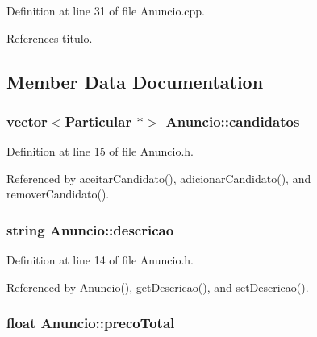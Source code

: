Definition at line 31 of file Anuncio.\+cpp.



References titulo.



\subsection{Member Data Documentation}
\hypertarget{class_anuncio_a387f6bd1b88720d5cf0b53462e5dc0aa}{
\subsubsection[{candidatos}]{\setlength{\rightskip}{0pt plus 5cm}vector$<${\bf Particular} $\ast$$>$ Anuncio\+::candidatos\hspace{0.3cm}{\ttfamily [private]}}}\label{class_anuncio_a387f6bd1b88720d5cf0b53462e5dc0aa}


Definition at line 15 of file Anuncio.\+h.



Referenced by aceitar\+Candidato(), adicionar\+Candidato(), and remover\+Candidato().

\hypertarget{class_anuncio_aa6a9eb8d08cb06d16061b006eb2c8b97}{
\subsubsection[{descricao}]{\setlength{\rightskip}{0pt plus 5cm}string Anuncio\+::descricao\hspace{0.3cm}{\ttfamily [private]}}}\label{class_anuncio_aa6a9eb8d08cb06d16061b006eb2c8b97}


Definition at line 14 of file Anuncio.\+h.



Referenced by Anuncio(), get\+Descricao(), and set\+Descricao().

\hypertarget{class_anuncio_a8ba7cc797b8b582c596038a17e9bce3b}{
\subsubsection[{preco\+Total}]{\setlength{\rightskip}{0pt plus 5cm}float Anuncio\+::preco\+Total\hspace{0.3cm}{\ttfamily [private]}}}\label{class_anuncio_a8ba7cc797b8b582c596038a17e9bce3b}


